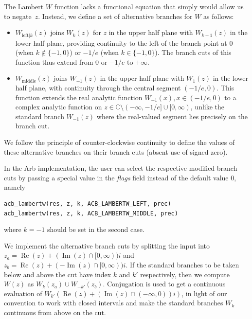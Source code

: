\documentclass[11pt,a4paper]{article}
\begin{document}
The Lambert $W$ function lacks a
functional equation that simply would allow us to negate~$z$. Instead, we
define a set of alternative branches for $W$ as follows:

\begin{itemize}
\item $W_{\mathrm{left}|k}(z)$ joins $W_k(z)$ for $z$ in the upper half plane with $W_{k+1}(z)$ in the lower half plane,
providing continuity to the left of the branch point at $0$ (when $k \notin \{-1,0\}$) or $-1/e$ (when $k \in \{-1,0\}$).
The branch cuts of this function thus extend from $0$ or $-1/e$ to $+\infty$.

\item $W_{\mathrm{middle}}(z)$ joins $W_{-1}(z)$ in the upper half plane with $W_1(z)$ in the lower half plane,
with continuity through the central segment $(-1/e,0)$.
This function extends the real analytic function $W_{-1}(x), x \in (-1/e,0)$
to a complex analytic function on $z \in \mathbb{C} \setminus (-\infty,-1/e] \cup [0,\infty)$,
unlike the standard branch $W_{-1}(z)$ where the real-valued segment
lies precisely on the branch cut.
\end{itemize}

We follow the principle of counter-clockwise continuity
to define the values of these alternative branches
on their branch cuts (absent use of signed zero).

In the Arb implementation, the user can select the respective modified
branch cuts by passing a special value in the \emph{flags} field
instead of the default value 0, namely
\begin{verbatim}
acb_lambertw(res, z, k, ACB_LAMBERTW_LEFT, prec)
acb_lambertw(res, z, k, ACB_LAMBERTW_MIDDLE, prec)
\end{verbatim}
where $k = -1$ should be set in the second case.

We implement the alternative branch cuts by splitting
the input into
$z_a = \operatorname{Re}(z) + (\operatorname{Im}(z) \cap [0,\infty)) i$
and $z_b = \operatorname{Re}(z) + (-\operatorname{Im}(z) \cap [0,\infty)) i$.
If the standard branches to be taken below and above the cut
have index $k$ and $k'$ respectively, then
we compute $W(z)$ as $W_k(z_a) \cup \overline{W_{-k'}(z_b)}$.
Conjugation is used to get a continuous evaluation of 
$W_{k'}(\operatorname{Re}(z) + (\operatorname{Im}(z) \cap (-\infty,0))i)$, in light of our convention
to work with closed intervals and make the standard branches $W_k$ continuous from above on the cut.
\end{document}
